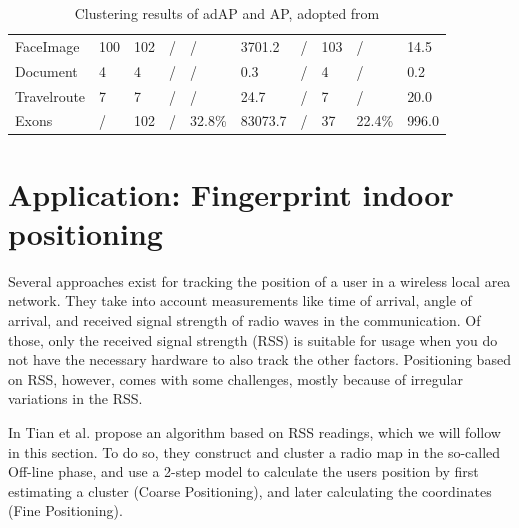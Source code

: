 \documentclass[11pt,a4paper]{article}
\begin{document}
\begin{table}[h]
\begin{center}
\begin{tabularx}{\textwidth}{@{}XYYYYYYYYY@{}}
			FaceImage   & 100      & 102     & /               & /       & 3701.2       & /                           & 103   & /      & 14.5       \\
			Document    & 4        & 4       & /               & /       & 0.3          & /                           & 4     & /      & 0.2        \\
			Travelroute & 7        & 7       & /               & /       & 24.7         & /                           & 7     & /      & 20.0       \\
			Exons       & /        & 102     & /               & 32.8\%  & 83073.7      & /                           & 37    & 22.4\% & 996.0      \\\hline
		\end{tabularx}
	\end{center}

	\caption{Clustering results of adAP and AP, adopted from \cite[p.~5]{wang2008adaptive}}
	\label{tbl:adapres}
\end{table}
\section{Application: Fingerprint indoor positioning}
Several approaches exist for tracking the position of a user in a wireless local area network. They take into account measurements like time of arrival, angle of arrival, and received signal strength of radio waves in the communication. Of those, only the received signal strength (RSS) is suitable for usage when you do not have the necessary hardware to also track the other factors. Positioning based on RSS, however, comes with some challenges, mostly because of irregular variations in the RSS.

In \cite{tian2013fingerprint} Tian et al. propose an algorithm based on RSS readings, which we will follow in this section. To do so, they construct and cluster a radio map in the so-called Off-line phase, and use a 2-step model to calculate the users position by first estimating a cluster (Coarse Positioning), and later calculating the coordinates (Fine Positioning). \cite{tian2013fingerprint}
\end{document}
